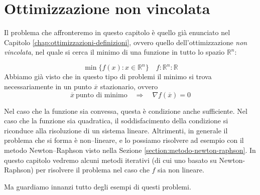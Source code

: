 

 

 \inbpdocument

\chapter{Ottimizzazione non vincolata}
\label{chap:ottimizzazione-non-vincolata}
 Il problema che affronteremo in
questo capitolo è quello gi\`a enunciato nel Capitolo
\ref{chap:ottimizzazioni-definizioni}, ovvero quello
dell'ottimizzazione \emph{non vincolata}, nel quale si cerca il minimo
di una funzione in tutto lo spazio $\mathbb{R}^n$:

$$ \min\{ f(x): x \in \mathbb{R}^n \} \quad  f: \mathbb{R}^n: \mathbb{R}$$
Abbiamo gi\`a visto che in questo tipo di problemi il minimo si trova
necessariamente in un punto $\overline{x}$ stazionario, ovvero
$$\overline{x}~ \text{punto di minimo}\quad \Longrightarrow \quad \nabla f(\overline{x})=0$$

Nel caso che la funzione sia convessa, questa \`e condizione anche
sufficiente. Nel caso che la funzione sia quadratica, il
soddisfacimento della condizione si riconduce alla risoluzione di un
sistema lineare. Altrimenti, in generale il problema che si forma \`e
non--lineare, e lo possiamo risolvere ad esempio con il metodo
Newton--Raphson visto nella Sezione
\ref{section:metodo-newton-raphson}. In questo capitolo vedremo alcuni
metodi iterativi (di cui uno basato su Newton-Raphson) per risolvere
il problema nel caso che $f$ sia non lineare.

Ma guardiamo innanzi tutto degli esempi di questi problemi.

